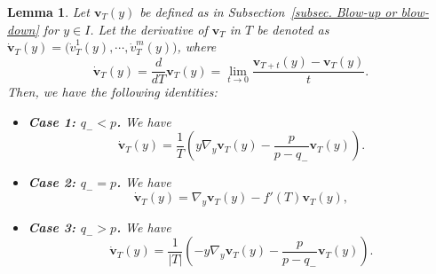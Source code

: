 \documentclass[11pt,twoside,reqno]{amsart}
\newtheorem{lemma}{Lemma}[section]
\numberwithin{equation}{section}
\begin{document}
\begin{lemma}\label{lem. v dot T (y)}
    Let $\mathbf{v}_{T}(y)$ be defined as in Subsection~\ref{subsec. Blow-up or blow-down} for $y\in I$. Let the derivative of $\mathbf{v}_{T}$ in $T$ be denoted as $\dot{\textbf{v}}_{T}(y)=\big(\dot{v}_{T}^{1}(y),\cdots,\dot{v}_{T}^{m}(y)\big)$, where
    \begin{equation*}
        \dot{\textbf{v}}_{T}(y)=\frac{d}{dT}\mathbf{v}_{T}(y)=\lim_{t\to0}\frac{\mathbf{v}_{T+t}(y)-\mathbf{v}_{T}(y)}{t}.
    \end{equation*}
    Then, we have the following identities:
    \begin{itemize}\item \textbf{Case 1: $q_{-}<p$.} We have
    \begin{equation*}
        \dot{\textbf{v}}_{T}(y)=\frac{1}{T}\left(y\nabla_y \mathbf{v}_T(y)-\frac{p}{p-q_{-}} \mathbf{v}_T(y)  \right).
    \end{equation*}
    \item \textbf{Case 2: $q_{-}=p$.} We have
    \begin{equation*}
\dot{\mathbf{v}}_T(y)=\nabla_y \mathbf{v}_T(y)-f'(T)\mathbf{v}_T(y),
\end{equation*}
    \item \textbf{Case 3: $q_{-}>p$.} We have
   \begin{equation*}
        \dot{\textbf{v}}_{T}(y)=\frac{1}{|T|}\left(-y\nabla_y \mathbf{v}_T(y)-\frac{p}{p-q_{-}} \mathbf{v}_T(y)  \right).
    \end{equation*}
\end{itemize}
\end{lemma}
\end{document}
